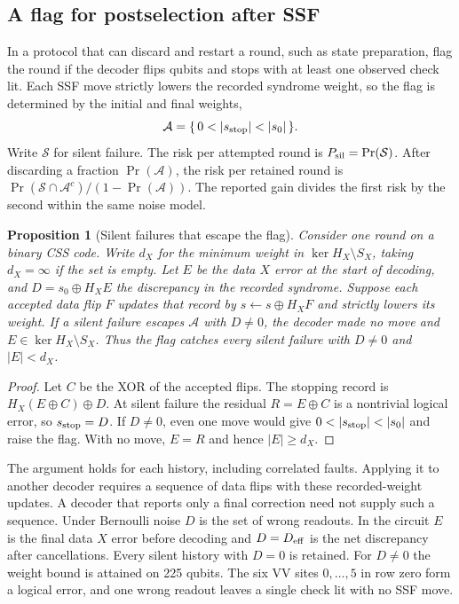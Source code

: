 \documentclass[10pt,twocolumn]{article}
\newtheorem{proposition}[theorem]{Proposition}
\theoremstyle{definition}
\begin{document}
\subsection{A flag for postselection after SSF}\label{sec:abort-flag}
In a protocol that can discard and restart a round, such as state
preparation, flag the round if the decoder flips qubits and stops
with at least one observed check lit. Each SSF move strictly lowers the recorded syndrome weight, so
the flag is determined by the initial and final weights,
\[
 \mathcal A=\{\,0<|s_{\rm stop}|<|s_0|\,\}.
\]
Write $\mathcal S$ for silent failure. The risk per attempted round
is $P_{\rm sil}=\Pr(\mathcal S)$. After discarding a fraction
$\Pr(\mathcal A)$, the risk per retained round is
$\Pr(\mathcal S\cap\mathcal A^c)/(1-\Pr(\mathcal A))$. The reported
gain divides the first risk by the second within the same noise model.

\begin{proposition}[Silent failures that escape the flag]\label{prop:flag-escape}
Consider one round on a binary CSS code. Write $d_X$ for the minimum
weight in $\ker H_X\setminus S_X$, taking $d_X=\infty$ if the set is
empty. Let $E$ be the data $X$ error at the start of decoding, and
$D=s_0\oplus H_XE$ the discrepancy in the recorded syndrome. Suppose
each accepted data flip $F$ updates that record by
$s\leftarrow s\oplus H_XF$ and strictly lowers its weight. If a silent
failure escapes $\mathcal A$ with $D\ne0$, the decoder made no move
and $E\in\ker H_X\setminus S_X$. Thus the flag catches every silent
failure with $D\ne0$ and $|E|<d_X$.
\end{proposition}
\begin{proof}
Let $C$ be the XOR of the accepted flips. The stopping record is
$H_X(E\oplus C)\oplus D$. At silent failure the residual $R=E\oplus C$
is a nontrivial logical error, so $s_{\rm stop}=D$. If $D\ne0$, even
one move would give $0<|s_{\rm stop}|<|s_0|$ and raise the flag.
With no move, $E=R$ and hence $|E|\ge d_X$.
\end{proof}

The argument holds for each history, including correlated faults.
Applying it to another decoder requires a sequence of data flips
with these recorded-weight updates. A decoder that reports only a
final correction need not supply such a sequence.
Under Bernoulli noise $D$ is the set of wrong readouts. In the circuit
$E$ is the final data $X$ error before decoding and $D=D_{\rm eff}$
is the net discrepancy after cancellations. Every silent history with
$D=0$ is retained. For $D\ne0$ the weight bound is attained on 225
qubits. The six VV sites $0,\ldots,5$ in row zero form a logical
error, and one wrong readout leaves a single check lit with no SSF move.
\end{document}
